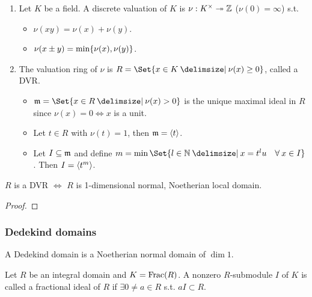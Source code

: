 \begin{definition} \mbox{}
  \begin{enumerate}[(1)]
    \item Let $K$ be a field. A discrete valuation of $K$ is
      $\nu: K^\times \twoheadrightarrow \mathbb{Z}$ ($\nu(0) = \infty$) s.t.
      \begin{itemize}
        \item $\nu(xy) = \nu(x) + \nu(y)$.
        \item $\nu(x \pm y) = \min\lbrace\nu(x), \nu(y)\rbrace$.
      \end{itemize}
    \item The valuation ring of $\nu$ is $R = \Set{x \in K \given \nu(x) \ge 0}$,
      called a DVR.
      \begin{itemize}
        \item $\mf = \Set{x \in R \given \nu(x) > 0}$ is the unique maximal ideal
          in $R$ since $\nu(x) = 0 \iff x$ is a unit.
        \item Let $t \in R$ with $\nu(t) = 1$, then $\mathfrak{m} = \langle t\rangle$.
        \item Let $I \subseteq \mathfrak{m}$ and define
          $m = \min\Set{l \in \Nb \given x = t^l u \quad \forall x \in I}$.
          Then $I = \langle t^m\rangle$.
      \end{itemize}
  \end{enumerate}
\end{definition}

\begin{prop}
  $R$ is a DVR $\iff$ $R$ is 1-dimensional normal, Noetherian local domain.
  \begin{proof}
  \end{proof}
\end{prop}

\subsubsection{Dedekind domains}
\begin{definition}
  A Dedekind domain is a Noetherian normal domain of $\dim 1$.
\end{definition}

\begin{definition}
  Let $R$ be an integral domain and $K = \operatorname{Frac}(R)$.
  A nonzero $R$-submodule $I$ of $K$ is called a fractional ideal of $R$ if
  $\exists 0 \ne a \in R$ s.t. $aI \subset R$.
\end{definition}

